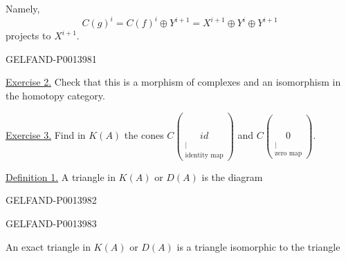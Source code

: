 Namely,
\[
C(g)^i=C(f)^i\oplus Y^{i+1}=X^{i+1}\oplus Y^i\oplus Y^{i+1}
\]
projects to \(X^{i+1}\).


\begin{GelfandAdjacentEvidence}{GELFAND-P001398}{1}

\uline{Exercise 2.} Check that this is a morphism of complexes and an isomorphism in the homotopy category.

\uline{Exercise 3.} Find in \(K(A)\) the cones
\(C(\underset{\substack{\vert\\\text{identity map}}}{id})\)
and
\(C(\underset{\substack{\vert\\\text{zero map}}}{0})\).

\uline{Definition 1.} A triangle in \(K(A)\) or \(D(A)\) is the diagram

\end{GelfandAdjacentEvidence}
\begin{GelfandAdjacentEvidence}{GELFAND-P001398}{2}


\end{GelfandAdjacentEvidence}
\begin{GelfandAdjacentEvidence}{GELFAND-P001398}{3}


 An exact triangle in \(K(A)\) or \(D(A)\) is a triangle isomorphic to the triangle

\end{GelfandAdjacentEvidence}



